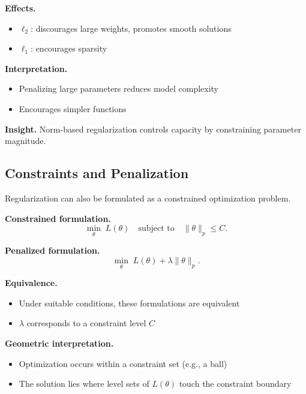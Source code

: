 \medskip

\noindent
\textbf{Effects.}
\begin{itemize}
    \item $\ell_2$: discourages large weights, promotes smooth solutions
    \item $\ell_1$: encourages sparsity
\end{itemize}

\medskip

\noindent
\textbf{Interpretation.}
\begin{itemize}
    \item Penalizing large parameters reduces model complexity
    \item Encourages simpler functions
\end{itemize}

\medskip

\noindent
\textbf{Insight.}  
Norm-based regularization controls capacity by constraining parameter magnitude.

\subsection{Constraints and Penalization}

Regularization can also be formulated as a constrained optimization problem.

\medskip

\noindent
\textbf{Constrained formulation.}
\[
\min_\theta \; L(\theta) \quad \text{subject to} \quad \|\theta\|_p \leq C.
\]

\medskip

\noindent
\textbf{Penalized formulation.}
\[
\min_\theta \; L(\theta) + \lambda \|\theta\|_p.
\]

\medskip

\noindent
\textbf{Equivalence.}
\begin{itemize}
    \item Under suitable conditions, these formulations are equivalent
    \item $\lambda$ corresponds to a constraint level $C$
\end{itemize}

\medskip

\noindent
\textbf{Geometric interpretation.}
\begin{itemize}
    \item Optimization occurs within a constraint set (e.g., a ball)
    \item The solution lies where level sets of $L(\theta)$ touch the constraint boundary
\end{itemize}

